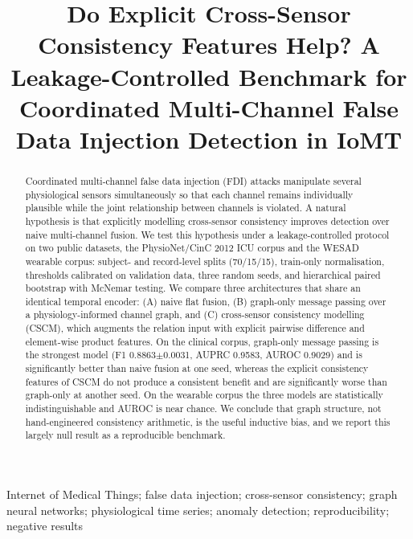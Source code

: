 \documentclass[conference]{IEEEtran}
\begin{document}
\title{Do Explicit Cross-Sensor Consistency Features Help? A Leakage-Controlled Benchmark for Coordinated Multi-Channel False Data Injection Detection in IoMT}
\author{
}
\maketitle
\begin{abstract}
Coordinated multi-channel false data injection (FDI) attacks manipulate several physiological sensors simultaneously so that each channel remains individually plausible while the joint relationship between channels is violated. A natural hypothesis is that explicitly modelling cross-sensor consistency improves detection over naive multi-channel fusion. We test this hypothesis under a leakage-controlled protocol on two public datasets, the PhysioNet/CinC 2012 ICU corpus and the WESAD wearable corpus: subject- and record-level splits (70/15/15), train-only normalisation, thresholds calibrated on validation data, three random seeds, and hierarchical paired bootstrap with McNemar testing. We compare three architectures that share an identical temporal encoder: (A) naive flat fusion, (B) graph-only message passing over a physiology-informed channel graph, and (C) cross-sensor consistency modelling (CSCM), which augments the relation input with explicit pairwise difference and element-wise product features. On the clinical corpus, graph-only message passing is the strongest model (F1 0.8863$\pm$0.0031, AUPRC 0.9583, AUROC 0.9029) and is significantly better than naive fusion at one seed, whereas the explicit consistency features of CSCM do not produce a consistent benefit and are significantly worse than graph-only at another seed. On the wearable corpus the three models are statistically indistinguishable and AUROC is near chance. We conclude that graph structure, not hand-engineered consistency arithmetic, is the useful inductive bias, and we report this largely null result as a reproducible benchmark.
\end{abstract}
\begin{IEEEkeywords}
Internet of Medical Things; false data injection; cross-sensor consistency; graph neural networks; physiological time series; anomaly detection; reproducibility; negative results
\end{IEEEkeywords}
\end{document}
